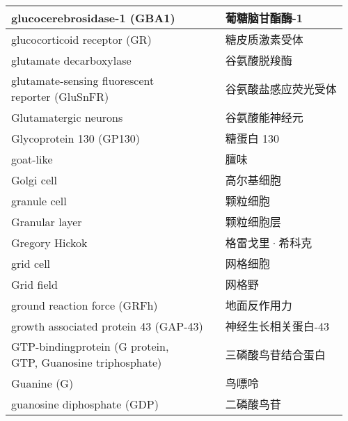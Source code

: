 \begin{longtable}{lll}
	\midrule
	glucocerebrosidase-1 (GBA1)     &&  葡糖脑甘酯酶-1  \\
	
	\midrule
	glucocorticoid receptor (GR)    &&  糖皮质激素受体  \\
	
	\midrule
	glutamate decarboxylase     &&  谷氨酸脱羧酶  \\
	
	\midrule
	\makecell{glutamate-sensing fluorescent \\ reporter (GluSnFR) }   &&  谷氨酸盐感应荧光受体  \\
	
	\midrule
	Glutamatergic neurons     &&  谷氨酸能神经元  \\
	
	\midrule
	Glycoprotein 130 (GP130)    &&  糖蛋白 130  \\
	
	\midrule
	goat-like     &&  	膻味  \\
	
	\midrule
	Golgi cell     &&  	高尔基细胞  \\
	
	\midrule
	granule cell     &&  	颗粒细胞  \\
	
	\midrule
	Granular layer     &&  	颗粒细胞层  \\
	
	\midrule
	Gregory Hickok     &&  	格雷戈里·希科克  \\
	
	\midrule
	grid cell     &&  	网格细胞  \\
	
	\midrule
	Grid field     &&  	网格野  \\
	
	\midrule
	ground reaction force (GRFh)     &&  地面反作用力  \\
	
	\midrule
	growth associated protein 43  (GAP-43)   &&  神经生长相关蛋白-43  \\
	
	\midrule
	\makecell{GTP-bindingprotein (G protein,\\ GTP, Guanosine triphosphate)}     &&  三磷酸鸟苷结合蛋白  \\
	
	\midrule
	Guanine (G)     &&  鸟嘌呤  \\
	
	\midrule
	guanosine diphosphate (GDP)    &&  二磷酸鸟苷  \\
	

\end{longtable}
